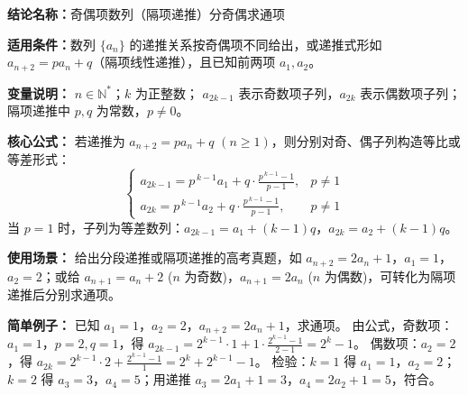 \textbf{结论名称：}奇偶项数列（隔项递推）分奇偶求通项

\textbf{适用条件：}数列 $\{a_n\}$ 的递推关系按奇偶项不同给出，或递推式形如 $a_{n+2}=pa_{n}+q$（隔项线性递推），且已知前两项 $a_1,a_2$。

\textbf{变量说明：}
$n\in \mathbb{N}^*$；$k$ 为正整数；
$a_{2k-1}$ 表示奇数项子列，$a_{2k}$ 表示偶数项子列；
隔项递推中 $p,q$ 为常数，$p\neq 0$。

\textbf{核心公式：}
若递推为 $a_{n+2}=p a_{n}+q$ $(n\geq 1)$，则分别对奇、偶子列构造等比或等差形式：
\[
\boxed{ 
\begin{cases}
a_{2k-1} = p^{\,k-1}a_1 + q\cdot\frac{p^{\,k-1}-1}{p-1}, & p\neq 1\\[6pt]
a_{2k}   = p^{\,k-1}a_2 + q\cdot\frac{p^{\,k-1}-1}{p-1}, & p\neq 1
\end{cases}}
\]
当 $p=1$ 时，子列为等差数列：$a_{2k-1}=a_1+(k-1)q$，$a_{2k}=a_2+(k-1)q$。

\textbf{使用场景：}
给出分段递推或隔项递推的高考真题，如 $a_{n+2}=2a_n+1$，$a_1=1$，$a_2=2$；或给 $a_{n+1}=a_n+2$ ($n$ 为奇数)，$a_{n+1}=2a_n$ ($n$ 为偶数)，可转化为隔项递推后分别求通项。

\textbf{简单例子：}
已知 $a_1=1$，$a_2=2$，$a_{n+2}=2a_n+1$，求通项。
由公式，奇数项：$a_1=1$，$p=2,q=1$，得 $a_{2k-1}=2^{k-1}\cdot 1+1\cdot\frac{2^{k-1}-1}{2-1}=2^k-1$。
偶数项：$a_2=2$，得 $a_{2k}=2^{k-1}\cdot 2+\frac{2^{k-1}-1}{1}=2^k+2^{k-1}-1$。
检验：$k=1$ 得 $a_1=1$，$a_2=2$；$k=2$ 得 $a_3=3$，$a_4=5$；用递推 $a_3=2a_1+1=3$，$a_4=2a_2+1=5$，符合。